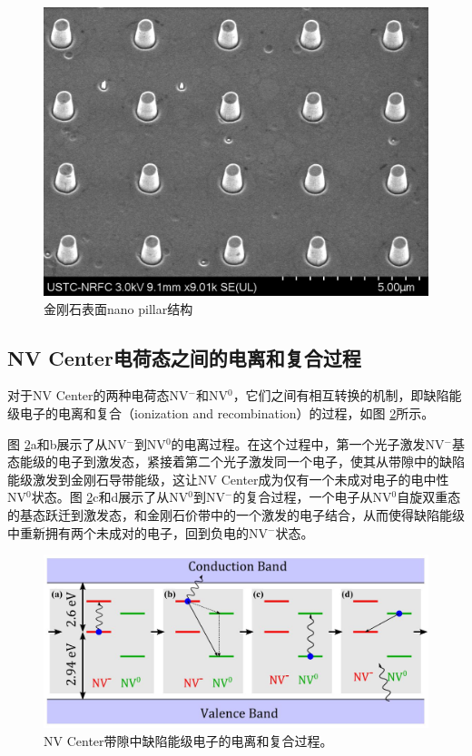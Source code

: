 \documentclass[type = bachelor]{whu-thesis}
\begin{document}
\begin{figure}
  \centering
  \includegraphics[width=1.0\textwidth]{figures/Chapter 3/nano pillar.png}
  \caption[金刚石表面nano pillar结构]{金刚石表面nano pillar结构}
  \label{fig: nano pillar}
\end{figure}

\subsection{NV Center电荷态之间的电离和复合过程}
对于NV Center的两种电荷态NV$^-$和NV$^0$，它们之间有相互转换的机制，即缺陷能级电子的电离和复合（ionization and recombination）的过程，如图 \ref{fig: Ionization and Recombination}所示。

图 \ref{fig: Ionization and Recombination}a和b展示了从NV$^-$到NV$^0$的电离过程。在这个过程中，第一个光子激发NV$^-$基态能级的电子到激发态，紧接着第二个光子激发同一个电子，使其从带隙中的缺陷能级激发到金刚石导带能级，这让NV Center成为仅有一个未成对电子的电中性NV$^0$状态。图 \ref{fig: Ionization and Recombination}c和d展示了从NV$^0$到NV$^-$的复合过程，一个电子从NV$^0$自旋双重态的基态跃迁到激发态，和金刚石价带中的一个激发的电子结合，从而使得缺陷能级中重新拥有两个未成对的电子，回到负电的NV$^-$状态。

\begin{figure}
  \centering
  \includegraphics[width=1.0\textwidth]{figures/Chapter 3/Ionization and Recombination.png}
  \caption[NV Center带隙中缺陷能级电子的电离和复合过程]{NV Center带隙中缺陷能级电子的电离和复合过程\cite{Aslam2013}。}
  \label{fig: Ionization and Recombination}
\end{figure}
\end{document}
